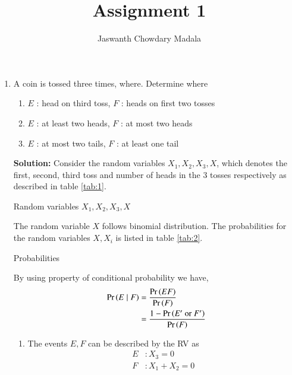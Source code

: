 \documentclass[journal,12pt,twocolumn]{IEEEtran}
\begin{document}
\vspace{3cm}


\title{Assignment 1}
\author{Jaswanth Chowdary Madala}





\maketitle

\newpage


\bigskip

\renewcommand{\thefigure}{\theenumi}
\renewcommand{\thetable}{\theenumi}



\begin{enumerate}
\item A coin is tossed three times, where. Determine  where
\begin{enumerate}
\item $E$ : head on third toss, $F$ : heads on first two tosses
\item $E$ : at least two heads, $F$ : at most two heads
\item $E$ : at most two tails, $F$ : at least one tail
\end{enumerate}
\textbf{Solution:} Consider the random variables $X_1, X_2, X_3,X$, which denotes the first, second, third toss and number of heads in the 3 tosses respectively as described in table \ref{tab:1}.
\begin{table}[h]
\centering

\caption{Random variables $X_1, X_2, X_3, X$}
\label{tab:1}
\end{table}

The random variable $X$ follows binomial distribution. The probabilities for the random variables $X, X_i$ is listed in table \ref{tab:2}.
\begin{table}[h]
\centering

\caption{Probabilities}
\label{tab:2}
\end{table}

By using property of conditional probability we have,
\begin{align}
\Pr\left(E \mid F\right) &= \frac{\Pr\left(EF\right)}{\Pr\left(F\right)} \label{eq:1}\\
&= \frac{1 - \Pr\left(E^{\prime} \text{ or }F^{\prime}\right)}{\Pr\left(F\right)}
\end{align}

\begin{enumerate}
\item  The events $E, F$ can be described by the RV as
\begin{align}
E &: X_3 = 0\\
F &: X_1 + X_2 = 0 
\end{align}


\end{enumerate}
\end{enumerate}
\end{document}
